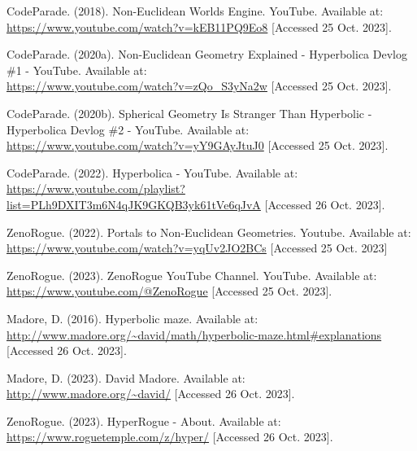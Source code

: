 \documentclass[]{article}
\begin{document}
    

        \newpage
        \begin{thebibliography}{9}

            CodeParade. (2018). Non-Euclidean Worlds Engine. YouTube. Available at: \\
            \url{https://www.youtube.com/watch?v=kEB11PQ9Eo8} [Accessed 25 Oct. 2023].
            
            CodeParade. (2020a). Non-Euclidean Geometry Explained - Hyperbolica Devlog \#1 - YouTube. Available at: \\
            \url{https://www.youtube.com/watch?v=zQo_S3yNa2w} [Accessed 25 Oct. 2023].
            
            CodeParade. (2020b). Spherical Geometry Is Stranger Than Hyperbolic - Hyperbolica Devlog \#2 - YouTube. Available at: \\
            \url{https://www.youtube.com/watch?v=yY9GAyJtuJ0} [Accessed 25 Oct. 2023].
            
            CodeParade. (2022). Hyperbolica - YouTube. Available at: \\
            \url{https://www.youtube.com/playlist?list=PLh9DXIT3m6N4qJK9GKQB3yk61tVe6qJvA} [Accessed 26 Oct. 2023].
            
            ZenoRogue. (2022). Portals to Non-Euclidean Geometries. Youtube. Available at: \\
            \url{https://www.youtube.com/watch?v=yqUv2JO2BCs} [Accessed 25 Oct. 2023]

            ZenoRogue. (2023). ZenoRogue YouTube Channel. YouTube. Available at: \\
            \url{https://www.youtube.com/@ZenoRogue} [Accessed 25 Oct. 2023].

            Madore, D. (2016). Hyperbolic maze. Available at: \\
            \url{http://www.madore.org/~david/math/hyperbolic-maze.html#explanations} [Accessed 26 Oct. 2023].
            
            Madore, D. (2023). David Madore. Available at: \\
            \url{http://www.madore.org/~david/} [Accessed 26 Oct. 2023].
            
            ZenoRogue. (2023). HyperRogue - About. Available at: \\
            \url{https://www.roguetemple.com/z/hyper/} [Accessed 26 Oct. 2023].

            

            
            \end{thebibliography}
            
        
\end{document}
